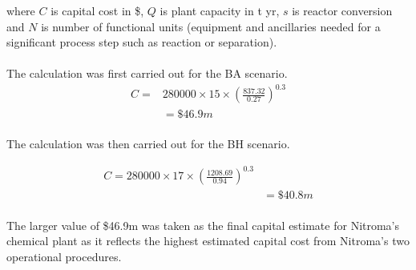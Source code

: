 \noindent where $C$ is capital cost in \$, $Q$ is  plant capacity in t yr, $s$ is reactor conversion and $N$ is number of functional units (equipment and ancillaries needed for a significant process step such as reaction or separation).\\
\\
The calculation was first carried out for the BA scenario.
\begin{equation}
\begin{split} 
C=& 280000 \times 15 \times \left(\frac{837.32}{0.27}\right)^{0.3}  \\
 & =\$46.9m 
\end{split}
\end{equation}
\\  
The calculation was then carried out for the BH scenario.

\begin{equation}
\begin{split} 
C=280000 \times 17 \times \left(\frac{1208.69}{0.94}\right)^{0.3}  \\
 & =\$40.8m 
\end{split}
\end{equation}
\\
The larger value of \$46.9m was taken as the final capital estimate for Nitroma's chemical plant as it reflects the highest estimated capital cost from Nitroma's two operational procedures.